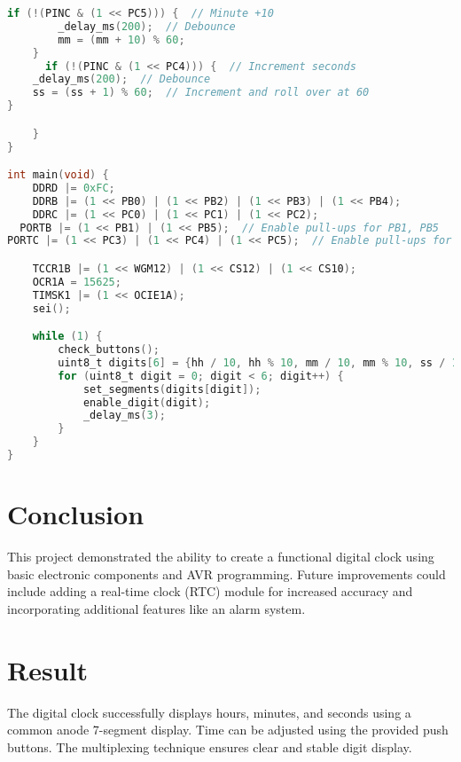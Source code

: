 \documentclass[journal]{IEEEtran}
\begin{document}
\begin{lstlisting}[language=C, basicstyle=\ttfamily, keywordstyle=\color{blue}, commentstyle=\color{green}]
    if (!(PINC & (1 << PC5))) {  // Minute +10
        _delay_ms(200);  // Debounce
        mm = (mm + 10) % 60;
    }
      if (!(PINC & (1 << PC4))) {  // Increment seconds
    _delay_ms(200);  // Debounce
    ss = (ss + 1) % 60;  // Increment and roll over at 60
}

    }
}

int main(void) {
    DDRD |= 0xFC;
    DDRB |= (1 << PB0) | (1 << PB2) | (1 << PB3) | (1 << PB4);
    DDRC |= (1 << PC0) | (1 << PC1) | (1 << PC2);
  PORTB |= (1 << PB1) | (1 << PB5);  // Enable pull-ups for PB1, PB5
PORTC |= (1 << PC3) | (1 << PC4) | (1 << PC5);  // Enable pull-ups for PC3, PC4, PC5

    TCCR1B |= (1 << WGM12) | (1 << CS12) | (1 << CS10);
    OCR1A = 15625;
    TIMSK1 |= (1 << OCIE1A);
    sei();

    while (1) {
        check_buttons();
        uint8_t digits[6] = {hh / 10, hh % 10, mm / 10, mm % 10, ss / 10, ss % 10};
        for (uint8_t digit = 0; digit < 6; digit++) {
            set_segments(digits[digit]);
            enable_digit(digit);
            _delay_ms(3);
        }
    }
}
\end{lstlisting}



\section{Conclusion}
This project demonstrated the ability to create a functional digital clock using basic electronic components and AVR programming. Future improvements could include adding a real-time clock (RTC) module for increased accuracy and incorporating additional features like an alarm system.
\section{Result}
The digital clock successfully displays hours, minutes, and seconds using a common anode 7-segment display. Time can be adjusted using the provided push buttons. The multiplexing technique ensures clear and stable digit display.
\end{document}
